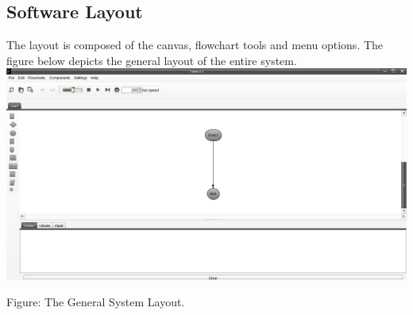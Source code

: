 \documentclass[11pt,a4paper,titlepage]{article}
\begin{document}
		\subsection{Software Layout}
		The layout is composed of the canvas, flowchart tools and menu options. \newline 
		The figure below depicts the general layout of the entire system. \newline \newline
		\includegraphics[width=\textwidth]{SystemLayout.jpg}
		\begin{center}
		Figure: The General System Layout.\newline
		\end{center}
		
\end{document}
